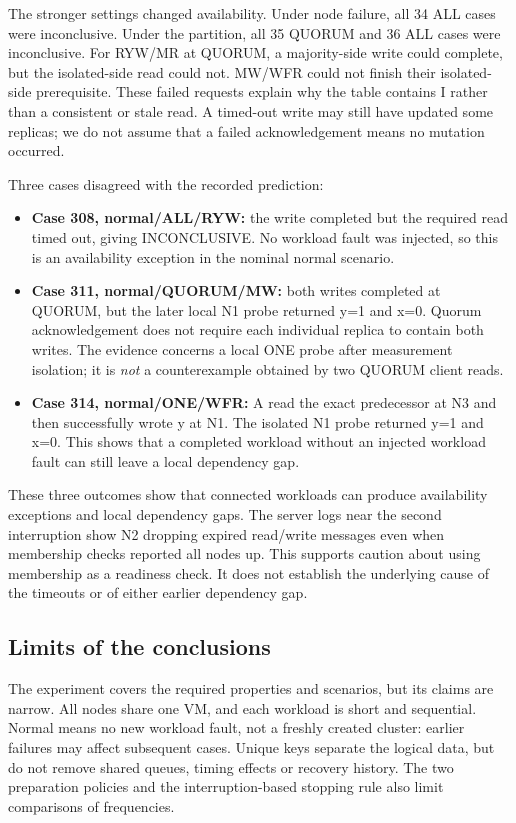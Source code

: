 \documentclass[lang=en,11pt,a4paper,bibend=bibtex]{elegantpaper}
\begin{document}
The stronger settings changed availability. Under node failure, all 34 ALL cases were inconclusive. Under the partition, all 35 QUORUM and 36 ALL cases were inconclusive. For RYW/MR at QUORUM, a majority-side write could complete, but the isolated-side read could not. MW/WFR could not finish their isolated-side prerequisite. These failed requests explain why the table contains I rather than a consistent or stale read. A timed-out write may still have updated some replicas; we do not assume that a failed acknowledgement means no mutation occurred.

Three cases disagreed with the recorded prediction:
\begin{itemize}[leftmargin=1.5em,itemsep=5pt]
\item \textbf{Case 308, normal/ALL/RYW:} the write completed but the required read timed out, giving INCONCLUSIVE. No workload fault was injected, so this is an availability exception in the nominal normal scenario.
\item \textbf{Case 311, normal/QUORUM/MW:} both writes completed at QUORUM, but the later local N1 probe returned y=1 and x=0. Quorum acknowledgement does not require each individual replica to contain both writes. The evidence concerns a local ONE probe after measurement isolation; it is \emph{not} a counterexample obtained by two QUORUM client reads.
\item \textbf{Case 314, normal/ONE/WFR:} A read the exact predecessor at N3 and then successfully wrote y at N1. The isolated N1 probe returned y=1 and x=0. This shows that a completed workload without an injected workload fault can still leave a local dependency gap.
\end{itemize}
These three outcomes show that connected workloads can produce availability exceptions and local dependency gaps. The server logs near the second interruption show N2 dropping expired read/write messages even when membership checks reported all nodes up. This supports caution about using membership as a readiness check. It does not establish the underlying cause of the timeouts or of either earlier dependency gap.

\subsection{Limits of the conclusions}
The experiment covers the required properties and scenarios, but its claims are narrow. All nodes share one VM, and each workload is short and sequential. Normal means no new workload fault, not a freshly created cluster: earlier failures may affect subsequent cases. Unique keys separate the logical data, but do not remove shared queues, timing effects or recovery history. The two preparation policies and the interruption-based stopping rule also limit comparisons of frequencies.
\end{document}

